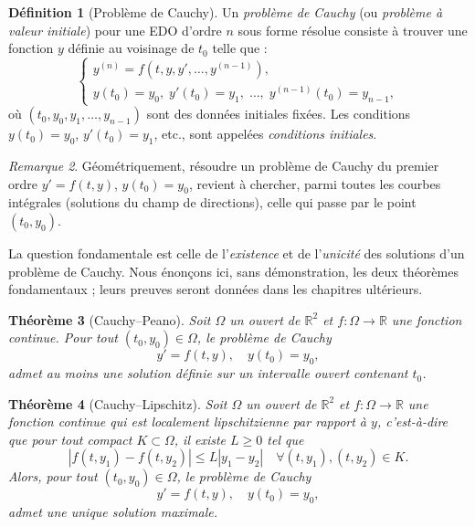\documentclass[12pt,a4paper,openany]{book}
\theoremstyle{definition}
\newtheorem{definition}{Définition}[chapter]
\theoremstyle{plain}
\newtheorem{theoreme}[definition]{Théorème}
\theoremstyle{remark}
\newtheorem{remarque}[definition]{Remarque}
\newcommand{\R}{\mathbb{R}}
\newcommand{\abs}[1]{\left|#1\right|}
\begin{document}
\begin{definition}[Problème de Cauchy]
\label{def:probleme-cauchy}
Un \emph{problème de Cauchy} (ou \emph{problème à valeur initiale}) pour une EDO d'ordre $n$ sous forme résolue consiste à trouver une fonction $y$ définie au voisinage de $t_0$ telle que :
\[
\begin{cases}
y^{(n)} = f(t, y, y', \ldots, y^{(n-1)}),\\[4pt]
y(t_0) = y_0,\; y'(t_0) = y_1,\; \ldots,\; y^{(n-1)}(t_0) = y_{n-1},
\end{cases}
\]
où $(t_0, y_0, y_1, \ldots, y_{n-1})$ sont des données initiales fixées. Les conditions $y(t_0) = y_0$, $y'(t_0) = y_1$, etc., sont appelées \emph{conditions initiales}.
\end{definition}

\begin{remarque}
\label{rem:geometrie-cauchy}
Géométriquement, résoudre un problème de Cauchy du premier ordre $y' = f(t,y)$, $y(t_0) = y_0$, revient à chercher, parmi toutes les courbes intégrales (solutions du champ de directions), celle qui passe par le point $(t_0, y_0)$.
\end{remarque}

La question fondamentale est celle de l'\emph{existence} et de l'\emph{unicité} des solutions d'un problème de Cauchy. Nous énonçons ici, sans démonstration, les deux théorèmes fondamentaux ; leurs preuves seront données dans les chapitres ultérieurs.

\begin{theoreme}[Cauchy--Peano]
\label{thm:cauchy-peano}
Soit $\Omega$ un ouvert de $\R^2$ et $f : \Omega \to \R$ une fonction continue. Pour tout $(t_0, y_0) \in \Omega$, le problème de Cauchy
\[
y' = f(t, y), \quad y(t_0) = y_0,
\]
admet au moins une solution définie sur un intervalle ouvert contenant $t_0$.
\end{theoreme}

\begin{theoreme}[Cauchy--Lipschitz]
\label{thm:cauchy-lipschitz}
Soit $\Omega$ un ouvert de $\R^2$ et $f : \Omega \to \R$ une fonction continue qui est \emph{localement lipschitzienne} par rapport à $y$, c'est-à-dire que pour tout compact $K \subset \Omega$, il existe $L \geq 0$ tel que
\[
\abs{f(t, y_1) - f(t, y_2)} \leq L \abs{y_1 - y_2} \quad \forall (t, y_1), (t, y_2) \in K.
\]
Alors, pour tout $(t_0, y_0) \in \Omega$, le problème de Cauchy
\[
y' = f(t, y), \quad y(t_0) = y_0,
\]
admet une unique solution maximale.
\end{theoreme}
\end{document}
